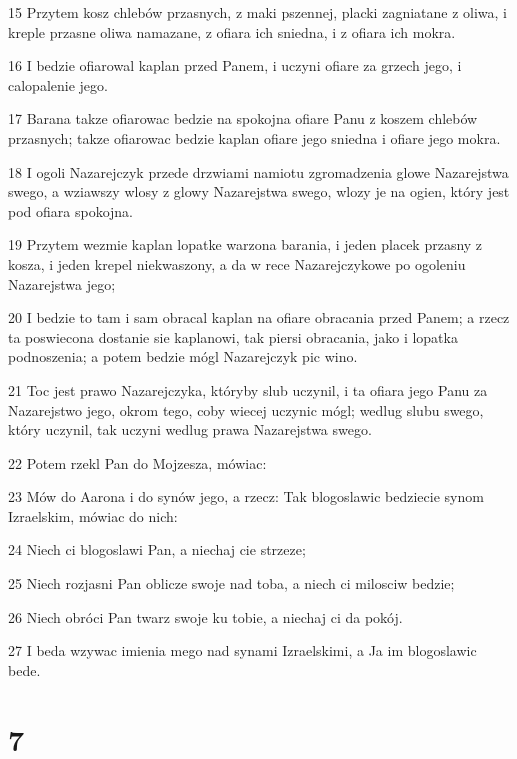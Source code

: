\par 15 Przytem kosz chlebów przasnych, z maki pszennej, placki zagniatane z oliwa, i kreple przasne oliwa namazane, z ofiara ich sniedna, i z ofiara ich mokra.
\par 16 I bedzie ofiarowal kaplan przed Panem, i uczyni ofiare za grzech jego, i calopalenie jego.
\par 17 Barana takze ofiarowac bedzie na spokojna ofiare Panu z koszem chlebów przasnych; takze ofiarowac bedzie kaplan ofiare jego sniedna i ofiare jego mokra.
\par 18 I ogoli Nazarejczyk przede drzwiami namiotu zgromadzenia glowe Nazarejstwa swego, a wziawszy wlosy z glowy Nazarejstwa swego, wlozy je na ogien, który jest pod ofiara spokojna.
\par 19 Przytem wezmie kaplan lopatke warzona barania, i jeden placek przasny z kosza, i jeden krepel niekwaszony, a da w rece Nazarejczykowe po ogoleniu Nazarejstwa jego;
\par 20 I bedzie to tam i sam obracal kaplan na ofiare obracania przed Panem; a rzecz ta poswiecona dostanie sie kaplanowi, tak piersi obracania, jako i lopatka podnoszenia; a potem bedzie mógl Nazarejczyk pic wino.
\par 21 Toc jest prawo Nazarejczyka, któryby slub uczynil, i ta ofiara jego Panu za Nazarejstwo jego, okrom tego, coby wiecej uczynic mógl; wedlug slubu swego, który uczynil, tak uczyni wedlug prawa Nazarejstwa swego.
\par 22 Potem rzekl Pan do Mojzesza, mówiac:
\par 23 Mów do Aarona i do synów jego, a rzecz: Tak blogoslawic bedziecie synom Izraelskim, mówiac do nich:
\par 24 Niech ci blogoslawi Pan, a niechaj cie strzeze;
\par 25 Niech rozjasni Pan oblicze swoje nad toba, a niech ci milosciw bedzie;
\par 26 Niech obróci Pan twarz swoje ku tobie, a niechaj ci da pokój.
\par 27 I beda wzywac imienia mego nad synami Izraelskimi, a Ja im blogoslawic bede.

\chapter{7}

